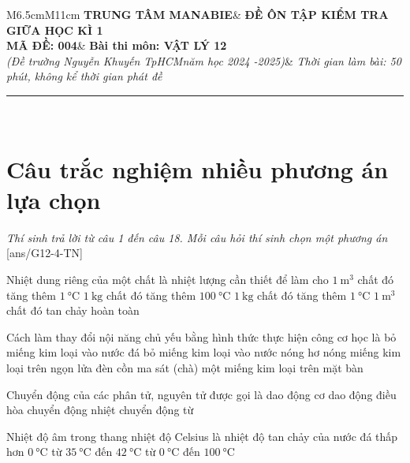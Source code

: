 \begin{tabular}{M{6.5cm}M{11cm}}
	\textbf{TRUNG TÂM MANABIE}& \textbf{ĐỀ ÔN TẬP KIỂM TRA GIỮA HỌC KÌ 1}\\
	\textbf{MÃ ĐỀ: 004}& \textbf{Bài thi môn: VẬT LÝ 12}\\
	\textit{(Đề trường Nguyễn Khuyến TpHCM\newline năm học 2024 -2025)}& \textit{Thời gian làm bài: 50 phút, không kể thời gian phát đề}
	
	\noindent\rule{4cm}{0.8pt} \\
\end{tabular}
\setcounter{section}{0}
\section{Câu trắc nghiệm nhiều phương án lựa chọn}
\textit{Thí sinh trả lời từ câu 1 đến câu 18. Mỗi câu hỏi thí sinh chọn một phương án}
\setcounter{ex}{0}
[ans/G12-4-TN]
\begin{ex}
	Nhiệt dung riêng của một chất là nhiệt lượng cần thiết để làm cho
	\choice
	{$\SI{1}{\meter^3}$ chất đó tăng thêm $\SI{1}{\celsius}$}
	{$\SI{1}{\kilogram}$ chất đó tăng thêm $\SI{100}{\celsius}$}
	{\True $\SI{1}{\kilogram}$ chất đó tăng thêm $\SI{1}{\celsius}$}
	{$\SI{1}{\meter^3}$ chất đó tan chảy hoàn toàn}
	\loigiai{}
\end{ex}
\begin{ex}
Cách làm thay đổi nội năng chủ yếu bằng hình thức thực hiện công cơ học là	
	\choice
	{bỏ miếng kim loại vào nước đá}
	{bỏ miếng kim loại vào nước nóng}
	{hơ nóng miếng kim loại trên ngọn lửa đèn cồn}
	{\True ma sát (chà) một miếng kim loại trên mặt bàn}
	\loigiai{}
\end{ex}
\begin{ex}
	Chuyển động của các phân tử, nguyên tử được gọi là
	\choice
	{dao động cơ}
	{dao động điều hòa}
	{\True chuyển động nhiệt}
	{chuyển động từ}
	\loigiai{}
\end{ex}
\begin{ex}
	Nhiệt độ âm trong thang nhiệt độ Celsius là nhiệt độ
	\choice
	{tan chảy của nước đá}
	{\True thấp hơn $\SI{0}{\celsius}$}
	{từ $\SI{35}{\celsius}$ đến $\SI{42}{\celsius}$}
	{từ $\SI{0}{\celsius}$ đến $\SI{100}{\celsius}$}
	\loigiai{}
\end{ex}
